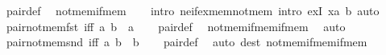\begin{isabellebody}
\endisadelimproof
%
\isatagproof
{}\isamarkupfalse%
\ pair{\isacharunderscore}{\kern0pt}def\ \isamarkupfalse%
\ not{\isacharunderscore}{\kern0pt}mem{\isacharunderscore}{\kern0pt}if{\isacharunderscore}{\kern0pt}mem\isanewline
\ \ \isamarkupfalse%
\ {\isacharparenleft}{\kern0pt}intro\ ne{\isacharunderscore}{\kern0pt}if{\isacharunderscore}{\kern0pt}ex{\isacharunderscore}{\kern0pt}mem{\isacharunderscore}{\kern0pt}not{\isacharunderscore}{\kern0pt}mem{\isacharcomma}{\kern0pt}\ intro\ exI{\isacharbrackleft}{\kern0pt}\ x{\isacharequal}{\kern0pt}{\isachardoublequoteopen}{\isacharbraceleft}{\kern0pt}a{\isacharcomma}{\kern0pt}\ b{\isacharbraceright}{\kern0pt}{\isachardoublequoteclose}{\isacharbrackright}{\kern0pt}{\isacharparenright}{\kern0pt}\ auto%
\endisatagproof
{\isafoldproof}%
%
\isadelimproof
\isanewline
%
\endisadelimproof
\isanewline
{}\isamarkupfalse%
\ pair{\isacharunderscore}{\kern0pt}not{\isacharunderscore}{\kern0pt}mem{\isacharunderscore}{\kern0pt}fst\ {\isacharbrackleft}{\kern0pt}iff{\isacharbrackright}{\kern0pt}{\isacharcolon}{\kern0pt}\ {\isachardoublequoteopen}{\isasymlangle}a{\isacharcomma}{\kern0pt}\ b{\isasymrangle}\ {\isasymnotin}\ a{\isachardoublequoteclose}\isanewline
%
\isadelimproof
\ \ %
\endisadelimproof
%
\isatagproof
{}\isamarkupfalse%
\ pair{\isacharunderscore}{\kern0pt}def\ \isamarkupfalse%
\ not{\isacharunderscore}{\kern0pt}mem{\isacharunderscore}{\kern0pt}if{\isacharunderscore}{\kern0pt}mem{\isacharunderscore}{\kern0pt}if{\isacharunderscore}{\kern0pt}mem\ \isamarkupfalse%
\ auto%
\endisatagproof
{\isafoldproof}%
%
\isadelimproof
\isanewline
%
\endisadelimproof
\isanewline
{}\isamarkupfalse%
\ pair{\isacharunderscore}{\kern0pt}not{\isacharunderscore}{\kern0pt}mem{\isacharunderscore}{\kern0pt}snd\ {\isacharbrackleft}{\kern0pt}iff{\isacharbrackright}{\kern0pt}{\isacharcolon}{\kern0pt}\ {\isachardoublequoteopen}{\isasymlangle}a{\isacharcomma}{\kern0pt}\ b{\isasymrangle}\ {\isasymnotin}\ b{\isachardoublequoteclose}\isanewline
%
\isadelimproof
\ \ %
\endisadelimproof
%
\isatagproof
{}\isamarkupfalse%
\ pair{\isacharunderscore}{\kern0pt}def\ \isamarkupfalse%
\ {\isacharparenleft}{\kern0pt}auto\ dest{\isacharcolon}{\kern0pt}\ not{\isacharunderscore}{\kern0pt}mem{\isacharunderscore}{\kern0pt}if{\isacharunderscore}{\kern0pt}mem{\isacharunderscore}{\kern0pt}if{\isacharunderscore}{\kern0pt}mem{\isacharparenright}{\kern0pt}%
\endisatagproof
{\isafoldproof}%

\end{isabellebody}
